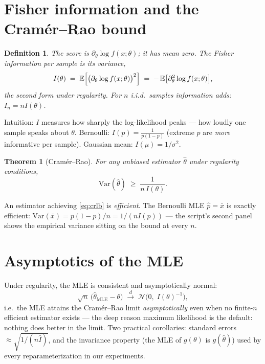 \documentclass[11pt]{article}
\newtheorem{theorem}{Theorem}
\newtheorem{definition}{Definition}
\begin{document}
\section{Fisher information and the Cram\'er--Rao bound}

\begin{definition}
The \emph{score} is $\partial_\theta \log f(x;\theta)$; it has mean zero.
The \emph{Fisher information} per sample is its variance,
\begin{equation}
  I(\theta)
  \;=\; \mathbb{E}\Bigl[\bigl(\partial_\theta \log f(x;\theta)\bigr)^2\Bigr]
  \;=\; -\,\mathbb{E}\bigl[\partial_\theta^2 \log f(x;\theta)\bigr],
  \label{eq:fisher}
\end{equation}
the second form under regularity. For $n$ i.i.d.\ samples information
adds: $I_n = n I(\theta)$.
\end{definition}

Intuition: $I$ measures how sharply the log-likelihood peaks --- how
loudly one sample speaks about $\theta$. Bernoulli:
$I(p) = \tfrac{1}{p(1-p)}$ (extreme $p$ are \emph{more} informative per
sample). Gaussian mean: $I(\mu) = 1/\sigma^2$.

\begin{theorem}[Cram\'er--Rao]
For any \emph{unbiased} estimator $\hat\theta$ under regularity
conditions,
\begin{equation}
  \boxed{\;\mathrm{Var}(\hat\theta) \;\ge\; \frac{1}{n\,I(\theta)} .\;}
  \label{eq:crlb}
\end{equation}
\end{theorem}

An estimator achieving \eqref{eq:crlb} is \emph{efficient}. The Bernoulli
MLE $\hat p = \bar x$ is exactly efficient:
$\mathrm{Var}(\bar x) = p(1-p)/n = 1/(nI(p))$ --- the script's second
panel shows the empirical variance sitting on the bound at every $n$.

\section{Asymptotics of the MLE}

Under regularity, the MLE is consistent and asymptotically normal:
\begin{equation}
  \sqrt{n}\,\bigl(\hat\theta_{\mathrm{MLE}} - \theta\bigr)
  \;\xrightarrow{\;d\;}\;
  \mathcal{N}\!\bigl(0,\; I(\theta)^{-1}\bigr),
  \label{eq:mleasymp}
\end{equation}
i.e.\ the MLE attains the Cram\'er--Rao limit \emph{asymptotically} even
when no finite-$n$ efficient estimator exists --- the deep reason maximum
likelihood is the default: nothing does better in the limit. Two
practical corollaries: standard errors
$\approx \sqrt{1/(n\hat I)}$, and the invariance property (the MLE of
$g(\theta)$ is $g(\hat\theta)$) used by every reparameterization in our
experiments.
\end{document}
